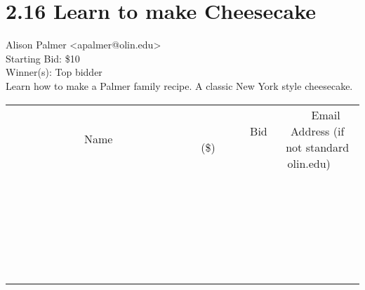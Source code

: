 \documentclass[11pt]{article}
\begin{document}
					\section*{2.16 Learn to make Cheesecake}
					Alison Palmer <apalmer@olin.edu> \\
					Starting Bid: \$10 \\
					Winner(s): Top bidder \\
					Learn how to make a Palmer family recipe. A classic New York style cheesecake. \\
					[6ex]
					\begin{tabular}{c c c}
						~~~~~~~~~~~~~Name~~~~~~~~~~~~~ & ~~~~~~~~~Bid (\$)~~~~~~~~~ & ~~~Email Address (if not standard olin.edu)~~~ \\
				
 & & \\
\hline
 & & \\
\hline
 & & \\
\hline
 & & \\
\hline
 & & \\
\hline
 & & \\
\hline
 & & \\
\hline
 & & \\
\hline
 & & \\
\hline
 & & \\
\hline
 & & \\
\hline
 & & \\
\hline
 & & \\
\hline
 & & \\
\hline
 & & \\
\hline
 & & \\
\hline
 & & \\
\hline
 & & \\
\hline
 & & \\
\hline
 & & \\
\hline
 & & \\
\hline
 & & \\
\hline
 & & \\
\hline
 & & \\
\hline
 & & \\
\hline
 & & \\
\hline
					\end{tabular}
					\clearpage
				
\end{document}
